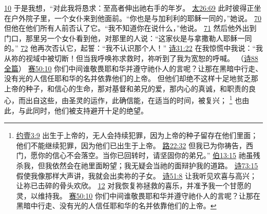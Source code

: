 \documentclass[12pt, a4paper, oneside]{ctexart}
\begin{document}
{		\href{https://biblehub.com/psalms/77-10.htm}{10} 于是我想，“对此我将恳求：至高者伸出祂右手的年岁。
		\href{https://biblehub.com/matthew/26-69.htm}{太26:69} 此时彼得正坐在户外院子里，一个女仆来到他面前。“你也是与加利利的耶稣一同的，”她说。
		\href{https://biblehub.com/matthew/26-70.htm}{70} 但他在他们所有人前否认了它。“我不知道你在说什么，”他说。
		\href{https://biblehub.com/matthew/26-71.htm}{71} 然后他外出到门口，那里另一个女仆看到他，对那里的人说：“这家伙是与拿撒勒人耶稣一同的。”
		\href{https://biblehub.com/matthew/26-72.htm}{72} 他再次否认它，起誓：“我不认识那个人！”
		\href{https://biblehub.com/psalms/31-22.htm}{诗31:22} 在我惊慌中我说：“我从祢的视域中被切断！但当我呼唤祢求救时，祢听到了我为宽恕的呼喊。
		（\href{https://biblehub.com/niv/psalms/88.htm}{诗88全篇}）
		\href{https://biblehub.com/isaiah/50-10.htm}{赛50:10} 你们中间谁敬畏耶和华并遵守祂仆人的言呢？让那在黑暗中行走、没有光的人信任耶和华的名并依靠他们的上帝。
	}
	但他们却绝不这样十足地贫乏那上帝的种子，和信心的生命，那对基督和弟兄的爱，那内心的真诚，和职责的良心，而出自这些，由圣灵的运作，此确信能，在适当的时间，被复兴；
	\footnote {
		\href{https://biblehub.com/1_john/3-9.htm}{约壹3:9} 出生于上帝的，无人会持续犯罪，因为上帝的种子留存在他们里面；他们不能继续犯罪，因为他们已出生于上帝。
		\href{https://biblehub.com/luke/22-32.htm}{路22:32} 但我已为你祷告，西门，愿你的信心不会落空。当你已回转时，请坚固你的弟兄。”
		\href{https://biblehub.com/job/13-15.htm}{伯13:15} 祂虽残杀我，但我依然会在祂里面盼望；我无疑会当祂的面辩护我的道路。
		\href{https://biblehub.com/psalms/73-15.htm}{诗73:15} 假使我像那样大声讲，我就会出卖祢的子女。
		\href{https://biblehub.com/psalms/51-8.htm}{诗51:8} 让我听见欢喜与高兴；让祢已击碎的骨头欢欣。
		\href{https://biblehub.com/psalms/51-12.htm}{12} 对我恢复祢拯救的喜乐，并准予我一个甘愿的灵，以维持我。
        \href{https://biblehub.com/isaiah/50-10.htm}{赛50:10} 你们中间谁敬畏耶和华并遵守祂仆人的言呢？让那在黑暗中行走、没有光的人信任耶和华的名并依靠他们的上帝。
	}
	也由此，与此同时，他们被支持避开十足的绝望。
\end{document}
